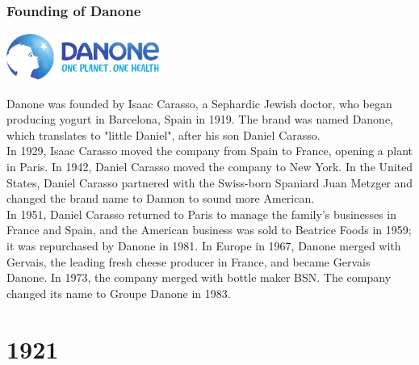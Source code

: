 \documentclass[11pt]{report}
\begin{document}
\section{}
\subsection{Founding of Danone}
\vspace{2mm}\begin{center}\includegraphics[width=5cm]{./img/danoneLogo.jpg}\end{center}
Danone was founded by Isaac Carasso, a Sephardic Jewish doctor, who began producing yogurt in Barcelona, Spain in 1919. The brand was named Danone, which translates to "little Daniel", after his son Daniel Carasso.\\
\indent In 1929, Isaac Carasso moved the company from Spain to France, opening a plant in Paris. In 1942, Daniel Carasso moved the company to New York. In the United States, Daniel Carasso partnered with the Swiss-born Spaniard Juan Metzger and changed the brand name to Dannon to sound more American.\\ \indent In 1951, Daniel Carasso returned to Paris to manage the family's businesses in France and Spain, and the American business was sold to Beatrice Foods in 1959; it was repurchased by Danone in 1981. In Europe in 1967, Danone merged with Gervais, the leading fresh cheese producer in France, and became Gervais Danone. In 1973, the company merged with bottle maker BSN. The company changed its name to Groupe Danone in 1983.

\chapter{1921}
\section{}
\end{document}
